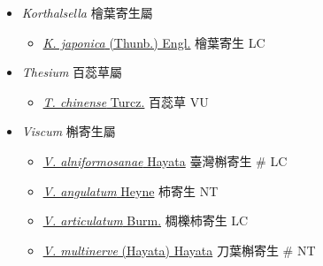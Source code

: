 
  \begin{itemize}
 \item[] \textit{Korthalsella} 檜葉寄生屬
                                
  \begin{itemize}
        \item[] \href{http://www.theplantlist.org/tpl1.1/search?q=Korthalsella+japonica}{\textit{K. japonica} (Thunb.) Engl.}   檜葉寄生   LC
  \end{itemize}
 \item[] \textit{Thesium} 百蕊草屬
                                
  \begin{itemize}
        \item[] \href{http://www.theplantlist.org/tpl1.1/search?q=Thesium+chinense}{\textit{T. chinense} Turcz.}   百蕊草   VU
  \end{itemize}
 \item[] \textit{Viscum} 槲寄生屬
                                
  \begin{itemize}
        \item[] \href{http://www.theplantlist.org/tpl1.1/search?q=Viscum+alniformosanae}{\textit{V. alniformosanae} Hayata}   臺灣槲寄生  \# LC
        \item[] \href{http://www.theplantlist.org/tpl1.1/search?q=Viscum+angulatum}{\textit{V. angulatum} Heyne}   柿寄生   NT
        \item[] \href{http://www.theplantlist.org/tpl1.1/search?q=Viscum+articulatum}{\textit{V. articulatum} Burm.}   椆櫟柿寄生   LC
        \item[] \href{http://www.theplantlist.org/tpl1.1/search?q=Viscum+multinerve}{\textit{V. multinerve} (Hayata) Hayata}   刀葉槲寄生  \# NT
  \end{itemize}
  \end{itemize}
